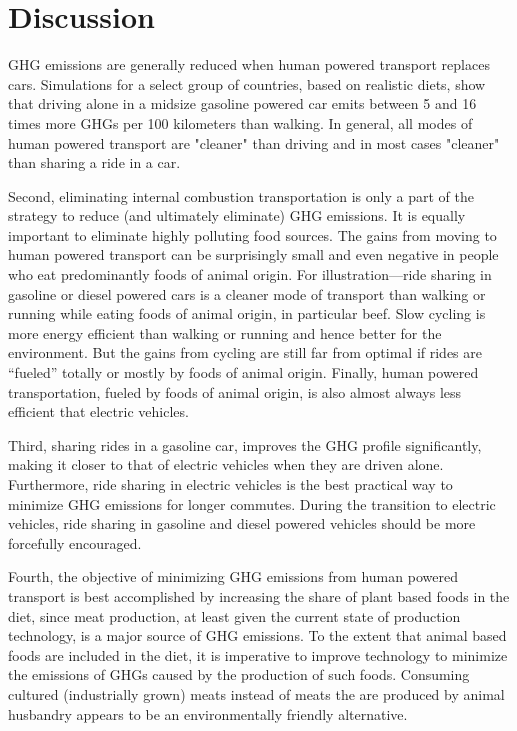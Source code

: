 \documentclass{article}[12pt,letterpaper]
\begin{document}
\section{Discussion}
GHG emissions are generally reduced when human powered transport replaces cars. Simulations for a select group of countries, based on realistic diets, show that driving alone in a midsize gasoline powered car emits between 5 and 16 times more GHGs per 100 kilometers than walking. In general, all modes of human powered transport are "cleaner" than driving and in most cases "cleaner" than sharing a ride in a car.

Second, eliminating internal combustion transportation is only a part of the strategy to reduce (and ultimately eliminate) GHG emissions. It is equally important to eliminate highly polluting food sources. The gains from moving to human powered transport can be surprisingly small and even negative in people who eat predominantly foods of animal origin. For illustration---ride sharing in gasoline or diesel powered cars is a cleaner mode of transport than walking or running while eating foods of animal origin, in particular beef. Slow cycling is more energy efficient than walking or running and hence better for the environment. But the gains from cycling are still far from optimal if rides are ``fueled'' totally or mostly by foods of animal origin. Finally, human powered transportation, fueled by foods of animal origin, is also almost always less efficient that electric vehicles.

Third, sharing rides in a gasoline car, improves the GHG profile significantly, making it closer to that of electric vehicles when they are driven alone. Furthermore, ride sharing in electric vehicles is the best practical way to minimize GHG emissions for longer commutes. During the transition to electric vehicles, ride sharing in gasoline and diesel powered vehicles should be more forcefully encouraged.

Fourth, the objective of minimizing GHG emissions from human powered transport is best accomplished by increasing the share of plant based foods in the diet, since meat production, at least given the current state of production technology, is a major source of GHG emissions. To the extent that animal based foods are included in the diet, it is imperative to improve technology to minimize the emissions of GHGs caused by the production of such foods. Consuming cultured (industrially grown) meats instead of meats the are produced by animal husbandry appears to be an environmentally friendly alternative. %
\end{document}
